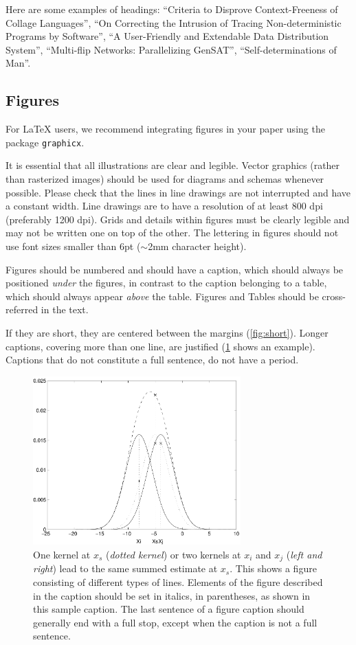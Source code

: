\documentclass[runningheads]{llncs}
\begin{document}
Here are some examples of headings: 
``Criteria to Disprove Context-Freeness of Collage Languages'', ``On Correcting the Intrusion of Tracing Non-deterministic Programs by Software'', ``A User-Friendly and Extendable Data Distribution System'', ``Multi-flip Networks: Parallelizing GenSAT'', ``Self-determinations of Man''.


\subsection{Figures}
\label{sect:figures}
For \LaTeX{} users, we recommend integrating figures in your paper using the package \texttt{graphicx}.

It is essential that all illustrations are clear and legible. 
Vector graphics (rather than rasterized images) should be used for diagrams and schemas whenever possible. 
Please check that the lines in line drawings are not interrupted and have a constant width. 
Line drawings are to have a resolution of at least 800 dpi (preferably 1200 dpi).
Grids and details within figures must be clearly legible and may not be written one on top of the other. 
The lettering in figures should not use font sizes smaller than 6\:pt ($\sim$2\:mm character height). 

Figures should be numbered and should have a caption, which should always be positioned \emph{under} the figures, in contrast to the caption belonging to a table, which should always appear \emph{above} the table.
Figures and Tables should be cross-referred in the text.

If they are short, they are centered between the margins (\cf \cref{fig:short}). 
Longer captions, covering more than one line, are justified (\cref{fig:example} shows an example). 
Captions that do not constitute a full sentence, do not have a period.


\begin{figure}[tb]
  \centering
  \includegraphics[height=6.5cm]{eijkel2}
  \caption{One kernel at $x_s$ (\emph{dotted kernel}) or two kernels at $x_i$ and $x_j$ (\emph{left and right}) lead to the same summed estimate at $x_s$.
    This shows a figure consisting of different types of lines.
    Elements of the figure described in the caption should be set in italics, in parentheses, as shown in this sample caption. 
    The last sentence of a figure caption should generally end with a full stop, except when the caption is not a full sentence.
  }
  \label{fig:example}
\end{figure}
\end{document}
